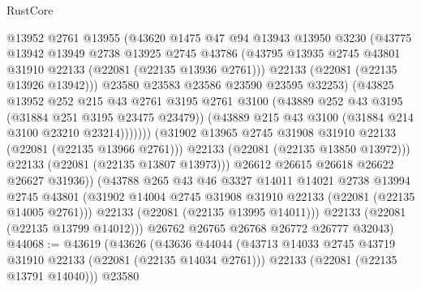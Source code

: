 \begin{lexlean}{RustCore}
\begin{coremodule}
                        @13952
                        @2761
                        @13955
                        (@43620
                          @1475
                          @47
                          @94
                          @13943
                          @13950
                          @3230
                          (@43775
                            @13942
                            @13949
                            @2738
                            @13925
                            @2745
                            @43786
                            (@43795
                              @13935
                              @2745
                              @43801
                              @31910
                              @22133
                              (@22081 (@22135 @13936 @2761)))
                            @22133
                            (@22081 (@22135 @13926 @13942)))
                          @23580
                          @23583
                          @23586
                          @23590
                          @23595
                          @32253)
                        (@43825
                          @13952
                          @252
                          @215
                          @43
                          @2761
                          @3195
                          @2761
                          @3100
                          (@43889 @252 @43 @3195 (@31884 @251 @3195 @23475 @23479))
                          (@43889 @215 @43 @3100 (@31884 @214 @3100 @23210 @23214)))))))
                (@31902 @13965 @2745 @31908 @31910 @22133 (@22081 (@22135 @13966 @2761)))
                @22133
                (@22081 (@22135 @13850 @13972)))
              @22133
              (@22081 (@22135 @13807 @13973)))
            @26612
            @26615
            @26618
            @26622
            @26627
            @31936))
        (@43788
          @265
          @43
          @46
          @3327
          @14011
          @14021
          @2738
          @13994
          @2745
          @43801
          (@31902 @14004 @2745 @31908 @31910 @22133 (@22081 (@22135 @14005 @2761)))
          @22133
          (@22081 (@22135 @13995 @14011)))
        @22133
        (@22081 (@22135 @13799 @14012)))
      @26762
      @26765
      @26768
      @26772
      @26777
      @32043)
@44068 := @43619
    (@43626
      (@43636
        @44044
        (@43713 @14033 @2745 @43719 @31910 @22133 (@22081 (@22135 @14034 @2761)))
        @22133
        (@22081 (@22135 @13791 @14040)))
      @23580

\end{coremodule}
\end{lexlean}
